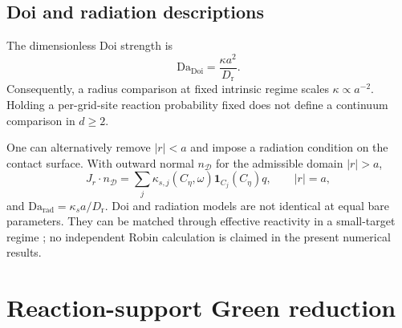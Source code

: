 \documentclass[aps,pre,reprint,amsmath,amssymb,longbibliography,floatfix]{revtex4-2}
\newcommand{\Dr}{D_{\mathrm r}}
\newcommand{\Da}{\mathrm{Da}}
\begin{document}
\subsection{Doi and radiation descriptions}
\label{sec:reaction-models}

The dimensionless Doi strength is
\begin{equation}
\Da_{\mathrm{Doi}}=\frac{\kappa a^2}{\Dr}.
\label{eq:doi-da}
\end{equation}
Consequently, a radius comparison at fixed intrinsic regime scales
\(\kappa\propto a^{-2}\). Holding a per-grid-site reaction probability fixed
does not define a continuum comparison in \(d\geq2\).

One can alternatively remove \(|r|<a\) and impose a radiation condition on
the contact surface. With outward normal \(n_{\mathcal D}\) for the admissible
domain \(|r|>a\),
\begin{equation}
J_r\cdot n_{\mathcal D}
=\sum_j\kappa_{s,j}(C_\eta,\omega)\mathbf 1_{C_j}(C_\eta)q,
\qquad |r|=a,
\label{eq:robin}
\end{equation}
and \(\Da_{\mathrm{rad}}=\kappa_sa/\Dr\).
Doi and radiation models are not identical at equal bare parameters. They
can be matched through effective reactivity in a small-target regime
\cite{isaacsonMauroNewby2016uniform,chapmanErbanIsaacson2016reactive};
no independent Robin calculation is claimed in the present numerical results.

\section{Reaction-support Green reduction}
\label{sec:green}
\end{document}
